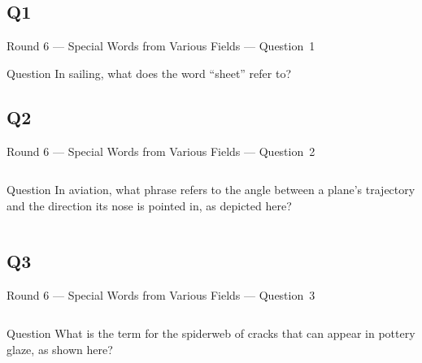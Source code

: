 \documentclass[11pt]{beamer}
\begin{document}
\subsection*{Q1}
\begin{frame}[t]{Round 6 --- Special Words from Various Fields --- \mbox{Question 1}}
\vspace{-0.5em}
\begin{block}{Question}
In sailing, what does the word ``sheet'' refer to?
\end{block}
\end{frame}
\subsection*{Q2}
\begin{frame}[t]{Round 6 --- Special Words from Various Fields --- \mbox{Question 2}}
\vspace{-0.5em}
\begin{columns}[T,totalwidth=\linewidth]
\begin{column}{0.32\linewidth}
\begin{block}{Question}
In aviation, what phrase refers to the angle between a plane's trajectory and the direction its nose is pointed in, as depicted here?
\end{block}
\end{column}
\begin{column}{0.65\linewidth}
\begin{center}
\texttt{[image: \{Images/angleofattack]}.png}
\end{center}
\end{column}
\end{columns}
\end{frame}
\subsection*{Q3}
\begin{frame}[t]{Round 6 --- Special Words from Various Fields --- \mbox{Question 3}}
\vspace{-0.5em}
\begin{columns}[T,totalwidth=\linewidth]
\begin{column}{0.32\linewidth}
\begin{block}{Question}
What is the term for the spiderweb of cracks that can appear in pottery glaze, as shown here?
\end{block}
\end{column}
\begin{column}{0.65\linewidth}
\begin{center}
\texttt{[image: \{Images/craze]}.jpg}
\end{center}
\end{column}
\end{columns}
\end{frame}
\end{document}

